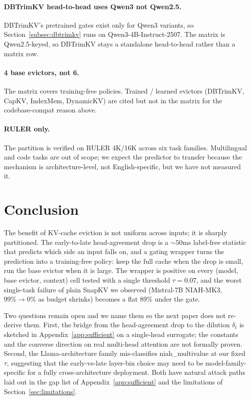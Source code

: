 \documentclass{article} %
\begin{document}
\paragraph{DBTrimKV head-to-head uses Qwen3 not Qwen2.5.} DBTrimKV's
pretrained gates exist only for Qwen3 variants, so
Section~\ref{subsec:dbtrimkv} runs on Qwen3-4B-Instruct-2507. The
matrix is Qwen2.5-keyed, so DBTrimKV stays a standalone head-to-head
rather than a matrix row.

\paragraph{4 base evictors, not 6.} The matrix covers training-free
policies. Trained / learned evictors (DBTrimKV, CapKV, IndexMem,
DynamicKV) are cited but not in the matrix for the codebase-compat
reason above.

\paragraph{RULER only.} The partition is verified on RULER 4K/16K
across six task families. Multilingual and code tasks are out of
scope; we expect the predictor to transfer because the mechanism is
architecture-level, not English-specific, but we have not measured it.

\section{Conclusion}
\label{sec:conclusion}

The benefit of KV-cache eviction is not uniform across inputs; it is
sharply partitioned. The early-to-late head-agreement drop is a
$\sim 50$ms label-free statistic that predicts which side an input
falls on, and a gating wrapper turns the prediction into a
training-free policy: keep the full cache when the drop is small, run
the base evictor when it is large. The wrapper is positive on every
(model, base evictor, context) cell tested with a single threshold
$\tau = 0.07$, and the worst single-task failure of plain SnapKV we
observed (Mistral-7B NIAH-MK3, $99\% \to 0\%$ as budget shrinks)
becomes a flat $89\%$ under the gate.

Two questions remain open and we name them so the next paper does not
re-derive them. First, the bridge from the head-agreement drop to
the dilution $\delta_t$ is sketched in Appendix~\ref{app:sufficient}
on a single-head surrogate; the constants and the converse direction
on real multi-head attention are not formally proven. Second, the
Llama-architecture family mis-classifies niah\_multivalue at our
fixed $\tau$, suggesting that the early-vs-late layer-bin choice may
need to be model-family-specific for a fully cross-architecture
deployment. Both have natural attack paths laid out in the gap list
of Appendix~\ref{app:sufficient} and the limitations of
Section~\ref{sec:limitations}.
\end{document}
